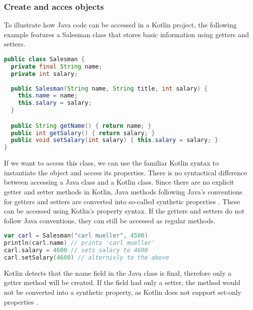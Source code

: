 \documentclass[a4paper,11pt]{article}
\begin{document}
\subsubsection{Create and acces objects}
To illustrate how Java code can be accessed in a Kotlin project, the following example features a Salesman class that stores basic information using getters and setters.
\begin{lstlisting}[language=Java,title={Example Java class}]
public class Salesman {
  private final String name;
  private int salary;
  
  public Salesman(String name, String title, int salary) {
    this.name = name;
    this.salary = salary;
  }

  public String getName() { return name; }
  public int getSalary() { return salary; }
  public void setSalary(int salary) { this.salary = salary; }
}
\end{lstlisting}
If we want to access this class, we can use the familiar Kotlin syntax \cite{interop} to instantiate the object and access its properties. There is no syntactical difference between accessing a Java class and a Kotlin class. Since there are no explicit getter and setter methods in Kotlin, Java methods following Java's conventions for getters and setters are converted \cite{interop-getter-setter} into so-called synthetic properties \cite{interop-synthetic-property}. These can be accessed using Kotlin’s property syntax. If the getters and setters do not follow Java conventions, they can still be accessed as regular methods.
\begin{lstlisting}[language=Kotlin, title={Access a Salesman instance in Kotlin}]
var carl = Salesman("carl mueller", 4500)
println(carl.name) // prints 'carl mueller'
carl.salary = 4600 // sets salary to 4600
carl.setSalary(4600) // alternivly to the above
\end{lstlisting}
Kotlin detects that the name field in the Java class is final, therefore only a getter method will be created. If the field had only a setter, the method would not be converted into a synthetic property, as Kotlin does not support set-only properties \cite{interop-synthetic-property}.
\end{document}
